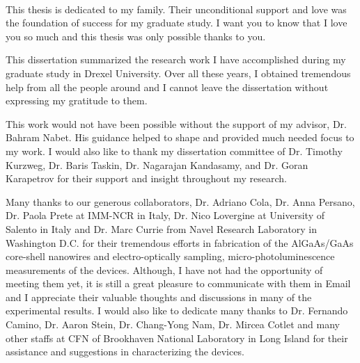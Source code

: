 \begin{preamble}

\iffinal{}{\newpage}

\begin{DUTdedications}
%
\vspace*{\fill}
%
\begin{center}
\begin{minipage}{8 cm}
\begin{center}
\hrulefill\\

This thesis is dedicated to my family. Their unconditional support and love was
the foundation of success for my graduate study. I want you to know that I love
you so much and this thesis was only possible thanks to you. 

\hrulefill
\vspace{6em}
\end{center}
\end{minipage}
\end{center}
\vspace*{\fill}
\end{DUTdedications}

\iffinal{}{\newpage}

\begin{acknowledgments}

This dissertation summarized the research work I have accomplished during my
graduate study in Drexel University. Over all these years, I obtained
tremendous help from all the people around and I cannot leave the dissertation
without expressing my gratitude to them.

This work would not have been possible without the support of my advisor, Dr.
Bahram Nabet. His guidance helped to shape and provided much needed focus to my
work.  I would also like to thank my dissertation committee of Dr. Timothy Kurzweg,
Dr. Baris Taskin, Dr. Nagarajan Kandasamy, and Dr. Goran Karapetrov for their
support and insight throughout my research.

Many thanks to our generous collaborators, Dr. Adriano Cola, Dr. Anna Persano,
Dr. Paola Prete at IMM-NCR in Italy, Dr. Nico Lovergine at University of
Salento in Italy and Dr. Marc Currie from Navel Research Laboratory in
Washington D.C. for their tremendous efforts in fabrication of the AlGaAs/GaAs
core-shell nanowires and electro-optically sampling, micro-photoluminescence
measurements of the devices. Although, I have not had the opportunity of
meeting them yet, it is still a great pleasure to communicate with them in
Email and I appreciate their valuable thoughts and discussions in many of the
experimental results. I would also like to dedicate many thanks to Dr. Fernando
Camino, Dr. Aaron Stein, Dr. Chang-Yong Nam, Dr. Mircea Cotlet and many other
staffs at CFN of Brookhaven National Laboratory in Long Island for their
assistance and suggestions in characterizing the devices.


\end{acknowledgments}
\end{preamble}
